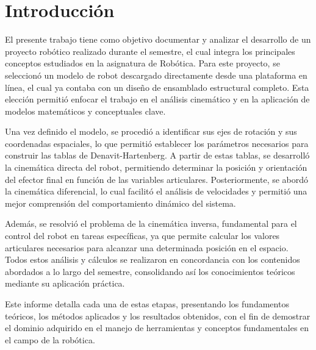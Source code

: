 \chapter{Introducción} \label{chap:introduccion}

El presente trabajo tiene como objetivo documentar y analizar el desarrollo de un proyecto robótico realizado durante el semestre, el cual integra los principales conceptos estudiados en la asignatura de Robótica. Para este proyecto, se seleccionó un modelo de robot descargado directamente desde una plataforma en línea, el cual ya contaba con un diseño de ensamblado estructural completo. Esta elección permitió enfocar el trabajo en el análisis cinemático y en la aplicación de modelos matemáticos y conceptuales clave.

Una vez definido el modelo, se procedió a identificar sus ejes de rotación y sus coordenadas espaciales, lo que permitió establecer los parámetros necesarios para construir las tablas de Denavit-Hartenberg. A partir de estas tablas, se desarrolló la cinemática directa del robot, permitiendo determinar la posición y orientación del efector final en función de las variables articulares. Posteriormente, se abordó la cinemática diferencial, lo cual facilitó el análisis de velocidades y permitió una mejor comprensión del comportamiento dinámico del sistema.

Además, se resolvió el problema de la cinemática inversa, fundamental para el control del robot en tareas específicas, ya que permite calcular los valores articulares necesarios para alcanzar una determinada posición en el espacio. Todos estos análisis y cálculos se realizaron en concordancia con los contenidos abordados a lo largo del semestre, consolidando así los conocimientos teóricos mediante su aplicación práctica.

Este informe detalla cada una de estas etapas, presentando los fundamentos teóricos, los métodos aplicados y los resultados obtenidos, con el fin de demostrar el dominio adquirido en el manejo de herramientas y conceptos fundamentales en el campo de la robótica.